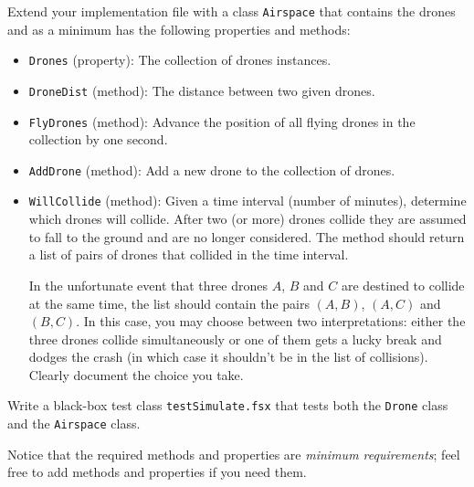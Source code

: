 Extend your implementation file with a class \lstinline{Airspace} that
contains the drones and as a minimum has the following
properties and methods:
\begin{itemize}
\item \lstinline{Drones} (property): The collection of drones instances.
\item \lstinline{DroneDist} (method): The distance between two given drones.
\item \lstinline{FlyDrones} (method): Advance the position of all
  flying drones in the collection by one second.
\item \lstinline{AddDrone} (method): Add a new drone to the collection
  of drones.
\item \lstinline{WillCollide} (method): Given a time interval (number
  of minutes), determine which drones will collide. After two (or
  more) drones collide they are assumed to fall to the ground and are
  no longer considered. The method should return a list of pairs of
  drones that collided in the time interval.

  In the unfortunate event that three drones $A$, $B$ and $C$ are
  destined to collide at the same time, the list should contain the
  pairs $(A,B)$, $(A,C)$ and $(B,C)$. In this case, you may choose
  between two interpretations: either the three drones collide
  simultaneously or one of them gets a lucky break and dodges the crash
  (in which case it shouldn't be in the list of collisions). Clearly
  document the choice you take.
\end{itemize}

Write a black-box test class \lstinline{testSimulate.fsx} that tests
both the \lstinline{Drone} class and the \lstinline{Airspace} class.

Notice that the required methods and properties are \emph{minimum
  requirements}; feel free to add methods and properties if you need
  them.
